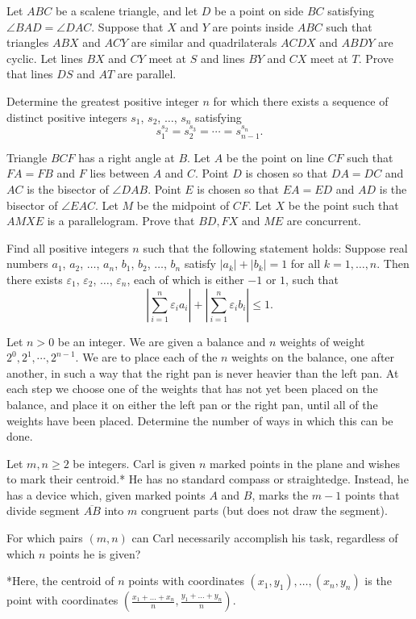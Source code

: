 \documentclass[11pt]{scrartcl}
\begin{document}
\begin{problem}[736821043753990]
Let $ABC$ be a scalene triangle, and let $D$ be a point on side $BC$ satisfying $\angle BAD=\angle DAC$. Suppose that $X$ and $Y$ are points inside $ABC$ such that triangles $ABX$ and $ACY$ are similar and quadrilaterals $ACDX$ and $ABDY$ are cyclic. Let lines $BX$ and $CY$ meet at $S$ and lines $BY$ and $CX$ meet at $T$. Prove that lines $DS$ and $AT$ are parallel.
\end{problem}
\begin{problem}[740814477661493]
Determine the greatest positive integer \(n\) for which there exists a sequence of distinct positive integers \(s_1\), \(s_2\), \(\ldots\), \(s_n\) satisfying\[s_1^{s_2}=s_2^{s_3}=\cdots=s_{n-1}^{s_n}.\]
\end{problem}
\begin{problem}[741259148493039]
	Triangle $BCF$ has a right angle at $B$. Let $A$ be the point on line $CF$ such that $FA=FB$ and $F$ lies between $A$ and $C$. Point $D$ is chosen so that $DA=DC$ and $AC$ is the bisector of $\angle{DAB}$. Point $E$ is chosen so that $EA=ED$ and $AD$ is the bisector of $\angle{EAC}$. Let $M$ be the midpoint of $CF$. Let $X$ be the point such that $AMXE$ is a parallelogram. Prove that $BD,FX$ and $ME$ are concurrent.
\end{problem}
\begin{problem}[741862231001118]
Find all positive integers $n$ such that the following statement holds: Suppose real numbers $a_1$, $a_2$, $\dots$, $a_n$, $b_1$, $b_2$, $\dots$, $b_n$ satisfy $|a_k|+|b_k|=1$ for all $k=1,\dots,n$. Then there exists $\varepsilon_1$, $\varepsilon_2$, $\dots$, $\varepsilon_n$, each of which is either $-1$ or $1$, such that
\[ \left| \sum_{i=1}^n \varepsilon_i a_i \right| + \left| \sum_{i=1}^n \varepsilon_i b_i \right| \le 1. \]
\end{problem}
\begin{problem}[742686070320805]
Let $n > 0$ be an integer. We are given a balance and $n$ weights of weight $2^0, 2^1, \cdots, 2^{n-1}$. We are to place each of the $n$ weights on the balance, one after another, in such a way that the right pan is never heavier than the left pan. At each step we choose one of the weights that has not yet been placed on the balance, and place it on either the left pan or the right pan, until all of the weights have been placed.
Determine the number of ways in which this can be done.
\end{problem}
\begin{problem}[744695293387960]
Let $m, n \ge 2$ be integers. Carl is given $n$ marked points in the plane and wishes to mark their centroid.* He has no standard compass or straightedge. Instead, he has a device which, given marked points $A$ and $B$, marks the $m-1$ points that divide segment $\overline{AB}$ into $m$ congruent parts (but does not draw the segment).

For which pairs $(m,n)$ can Carl necessarily accomplish his task, regardless of which $n$ points he is given?

*Here, the centroid of $n$ points with coordinates $(x_1, y_1), \dots, (x_n, y_n)$ is the point with coordinates $\left( \frac{x_1 + \dots + x_n}{n}, \frac{y_1 + \dots + y_n}{n}\right)$.
\end{problem}
\end{document}
